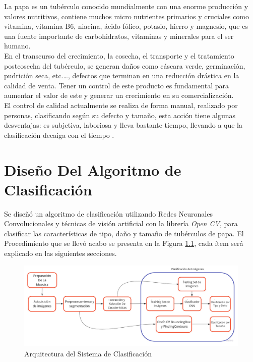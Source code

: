 La papa es un tubérculo conocido mundialmente con una enorme producción y valores nutritivos, contiene muchos micro nutrientes primarios y cruciales como vitamina, vitamina B6, niacina, ácido fólico, potasio, hierro y magnesio, que es una fuente importante de carbohidratos, vitaminas y minerales para el ser humano.\\
En el transcurso del crecimiento, la cosecha, el transporte y el tratamiento postcosecha del tubérculo, se generan daños como cáscara verde, germinación, pudrición seca, etc.…, defectos que terminan en una reducción drástica en la calidad de venta. Tener un control de este producto es fundamental para aumentar el valor de este y generar un crecimiento en su comercialización.\\
El control de calidad actualmente se realiza de forma manual, realizado por personas, clasificando según su defecto y tamaño, esta acción tiene algunas desventajas: es subjetiva, laboriosa y lleva bastante tiempo, llevando a que la clasificación decaiga con el tiempo \cite{refjaither}.



\chapter{Diseño Del Algoritmo de Clasificación}


Se diseñó un algoritmo de clasificación utilizando Redes Neuronales Convolucionales y técnicas de visión artificial con la librería \textit{Open CV}, para clasificar las características de tipo, daño y tamaño de tubérculos de papa. El Procedimiento que se llevó acabo se presenta en la Figura \ref{fig:flujogeneral}, cada ítem será explicado en las siguientes secciones. 


\begin{figure}[ht]
	\centering
	\includegraphics[scale=0.3]{Figs/FGGeneral.jpg}
	\caption{Arquitectura del Sistema de Clasificación}
	\label{fig:flujogeneral}
\end{figure}

